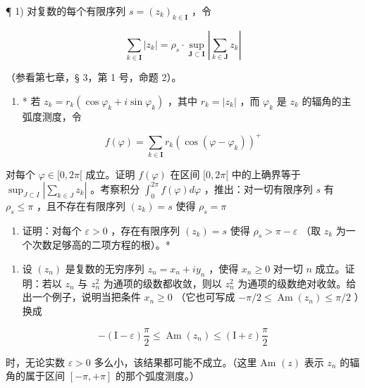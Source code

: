 \ExerciseSection

¶ 1) 对复数的每个有限序列 \(s = (z_k)_{k \in \mathbf{I}}\) ，令

\[
\sum_ {k \in \mathbf {I}} | z _ {k} | = \rho_ {s} \cdot \sup _ {\mathbf {J} \subset \mathbf {I}} \left| \sum_ {k \in \mathbf {J}} z _ {k} \right|
\]

（参看第七章，§ 3，第 1 号，命题 2）。

\begin{enumerate}
\def\labelenumi{\alph{enumi})}
\tightlist
\item
  * 若 \(z_{k} = r_{k} (\cos \varphi_{k} + i \sin \varphi_{k})\) ，其中 \(r_{k} = |z_{k}|\) ，而 \(\varphi_{k}\) 是 \(z_{k}\) 的辐角的主弧度测度，令
\end{enumerate}

\[
f (\varphi) = \sum_ {k \in \mathbf {I}} r _ {k} (\cos (\varphi - \varphi_ {k})) ^ {+}
\]

对每个 \(\varphi \in [0, 2\pi[\) 成立。证明 \(f(\varphi)\) 在区间 \([0, 2\pi[\) 中的上确界等于 \(\sup_{J \subset I} \left| \sum_{k \in J} z_k \right|\) 。考察积分 \(\int_0^{2\pi}f(\varphi)d\varphi\) ，推出：对一切有限序列 \(s\) 有 \(\rho_{s}\leqslant \pi\) ，且不存在有限序列 \((z_k) = s\) 使得 \(\rho_{s} = \pi\)

\begin{enumerate}
\def\labelenumi{\alph{enumi})}
\setcounter{enumi}{1}
\tightlist
\item
  证明：对每个 \(\varepsilon > 0\) ，存在有限序列 \((z_k) = s\) 使得 \(\rho_s > \pi - \varepsilon\) （取 \(z_k\) 为一个次数足够高的二项方程的根）。*
\end{enumerate}

\begin{enumerate}
\def\labelenumi{\arabic{enumi})}
\setcounter{enumi}{1}
\tightlist
\item
  设 \((z_{n})\) 是复数的无穷序列 \(z_{n} = x_{n} + iy_{n}\) ，使得 \(x_{n} \geqslant 0\) 对一切 \(n\) 成立。证明：若以 \(z_{n}\) 与 \(z_{n}^{2}\) 为通项的级数都收敛，则以 \(z_{n}^{2}\) 为通项的级数绝对收敛。给出一个例子，说明当把条件 \(x_{n} \geqslant 0\) （它也可写成 \(-\pi / 2 \leqslant \operatorname{Am}(z_{n}) \leqslant \pi / 2\) ）换成
\end{enumerate}

\[
- (\mathrm{I} - \varepsilon) \frac {\pi}{2} \leqslant \operatorname{Am} (z _ {n}) \leqslant (\mathrm{I} + \varepsilon) \frac {\pi}{2}
\]

时，无论实数 \(\varepsilon > 0\) 多么小，该结果都可能不成立。（这里 Am \((z)\) 表示 \(z_{n}\) 的辐角的属于区间 \([- \pi, +\pi]\) 的那个弧度测度。）

